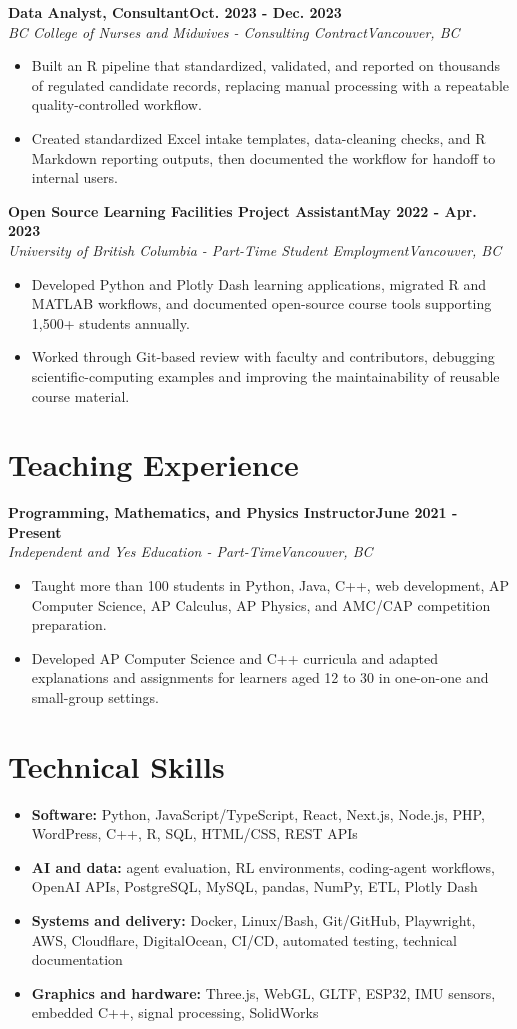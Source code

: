 \documentclass[10pt,letterpaper]{article}
\newenvironment{bullets}{\begin{itemize}[topsep=0.03cm,parsep=0pt,partopsep=0pt,itemsep=0.02cm,leftmargin=11pt]}{\end{itemize}}
\newcommand{\role}[4]{\needspace{3\baselineskip}\textbf{#1}\hfill\textbf{#2}\\[-1pt]\textit{#3}\hfill\textit{#4}\par}
\begin{document}
\role{Data Analyst, Consultant}{Oct. 2023 - Dec. 2023}{BC College of Nurses and Midwives - Consulting Contract}{Vancouver, BC}
\begin{bullets}
\item Built an R pipeline that standardized, validated, and reported on thousands of regulated candidate records, replacing manual processing with a repeatable quality-controlled workflow.
\item Created standardized Excel intake templates, data-cleaning checks, and R Markdown reporting outputs, then documented the workflow for handoff to internal users.
\end{bullets}

\role{Open Source Learning Facilities Project Assistant}{May 2022 - Apr. 2023}{University of British Columbia - Part-Time Student Employment}{Vancouver, BC}
\begin{bullets}
\item Developed Python and Plotly Dash learning applications, migrated R and MATLAB workflows, and documented open-source course tools supporting 1,500+ students annually.
\item Worked through Git-based review with faculty and contributors, debugging scientific-computing examples and improving the maintainability of reusable course material.
\end{bullets}

\section{Teaching Experience}
\role{Programming, Mathematics, and Physics Instructor}{June 2021 - Present}{Independent and Yes Education - Part-Time}{Vancouver, BC}
\begin{bullets}
\item Taught more than 100 students in Python, Java, C++, web development, AP Computer Science, AP Calculus, AP Physics, and AMC/CAP competition preparation.
\item Developed AP Computer Science and C++ curricula and adapted explanations and assignments for learners aged 12 to 30 in one-on-one and small-group settings.
\end{bullets}

\section{Technical Skills}
\begin{bullets}
\item \textbf{Software:} Python, JavaScript/TypeScript, React, Next.js, Node.js, PHP, WordPress, C++, R, SQL, HTML/CSS, REST APIs
\item \textbf{AI and data:} agent evaluation, RL environments, coding-agent workflows, OpenAI APIs, PostgreSQL, MySQL, pandas, NumPy, ETL, Plotly Dash
\item \textbf{Systems and delivery:} Docker, Linux/Bash, Git/GitHub, Playwright, AWS, Cloudflare, DigitalOcean, CI/CD, automated testing, technical documentation
\item \textbf{Graphics and hardware:} Three.js, WebGL, GLTF, ESP32, IMU sensors, embedded C++, signal processing, SolidWorks
\end{bullets}
\end{document}
